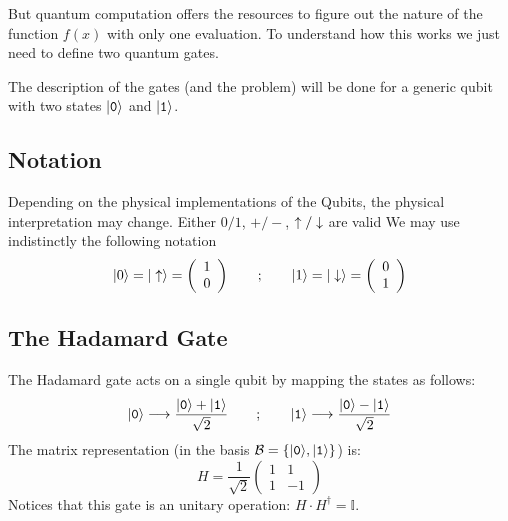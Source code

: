But quantum computation offers the resources to figure out the nature of the function $f(x)$ with only one evaluation. To understand how this works we just need to define two quantum gates.

The description of the gates (and the problem) will be done for a generic qubit with two states $|\texttt{0}\rangle$ and $|\texttt{1}\rangle$.

\subsection{Notation}
Depending on the physical implementations of the Qubits, the physical interpretation may change. Either $0/1$, $+/-$, $\uparrow/\downarrow$ are valid We may use indistinctly the following notation
\begin{equation}
  |0\rangle = |\uparrow\rangle =
  \left(\begin{array}{c}
        1 \\
        0
        \end{array}\right)
\qquad;\qquad
  |1\rangle = |\downarrow\rangle =
  \left(\begin{array}{c}
        0 \\
        1
        \end{array}\right)
\end{equation}



\subsection{The Hadamard Gate}
The Hadamard gate acts on a single qubit by mapping the states as follows:
\begin{equation}
  |\texttt{0}\rangle \longrightarrow \frac{|\texttt{0}\rangle+|\texttt{1}\rangle}{\sqrt{2}}
  \qquad;\qquad
  |\texttt{1}\rangle \longrightarrow \frac{|\texttt{0}\rangle-|\texttt{1}\rangle}{\sqrt{2}}
\label{Hmap}
\end{equation}
The matrix representation (in the basis $\mathcal{B}=\left\{|\texttt{0}\rangle,|\texttt{1}\rangle\right\}$) is:
\begin{equation}
  H=\frac{1}{\sqrt{2}}\left(\begin{array}{cc}
  1 & 1 \\
  1 & -1
  \end{array}\right)
\label{hadamard}
\end{equation}
Notices that this gate is an unitary operation: $H\cdot H^{\dagger}=\mathbb{I}$.

